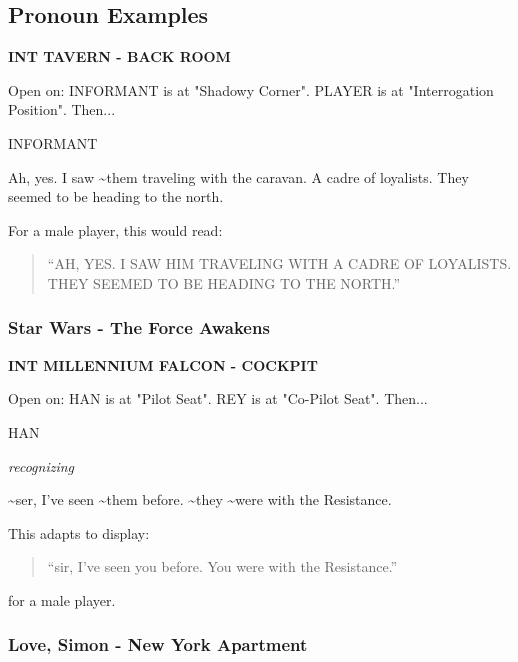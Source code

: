 \documentclass[11pt,letterpaper,oldstylefigures]{memoir}
\newcommand{\slugline}[1]{\nobreak\textbf{\MakeUppercase{#1}}\par\nobreak\vspace{1\baselineskip}}
\newcommand{\speaker}[1]{\nobreak\hspace*{0.333\textwidth}\MakeUppercase{#1}\par\nobreak\vspace{0.5\baselineskip}}
\newcommand{\dialogue}[1]{\nobreak\hspace*{0.25\textwidth}\begin{minipage}{0.5\textwidth}#1\end{minipage}\par\vspace{1\baselineskip}}
\newcommand{\parenthetical}[1]{\nobreak\vspace{0.5\baselineskip}\hspace*{0.292\textwidth}\begin{minipage}{0.416\textwidth}\textit{#1}\end{minipage}\par\vspace{0.5\baselineskip}}
\newcommand{\stagedir}[1]{#1\par\vspace{1\baselineskip}}
\newenvironment{FountainExample}
  {\begingroup
  \ttfamily\small
   \setlength{\parindent}{0pt}
  \setlength{\parskip}{0.5em}
  \allowdisplaybreaks
  \setlength{\displaywidowpenalty}{0}
  \setlength{\widowpenalty}{0}
  \setlength{\clubpenalty}{0}
  \setlength{\interlinepenalty}{0}
}
  {\endgroup}
\begin{document}
\subsection{Pronoun Examples}

\begin{FountainExample}
\slugline{INT TAVERN - BACK ROOM}

\stagedir{Open on: INFORMANT is at "Shadowy Corner". PLAYER is at "Interrogation Position". Then...}

\speaker{INFORMANT}
\dialogue{Ah, yes. I saw \textasciitilde{}them traveling with the caravan. A cadre of loyalists. They seemed to be heading to the north.}
\end{FountainExample}

For a male player, this would read:
\begin{quote}
``AH, YES. I SAW HIM TRAVELING WITH A CADRE OF LOYALISTS. THEY SEEMED TO BE HEADING TO THE NORTH.''
\end{quote}

\subsubsection*{Star Wars - The Force Awakens}
\label{ex:star-wars-the-force-awakens}

\begin{FountainExample}
\slugline{INT MILLENNIUM FALCON - COCKPIT}

\stagedir{Open on: HAN is at "Pilot Seat". REY is at "Co-Pilot Seat". Then...}

\speaker{HAN}
\parenthetical{recognizing}
\dialogue{\textasciitilde{}ser, I've seen \textasciitilde{}them before. \textasciitilde{}they \textasciitilde{}were with the Resistance.}
\end{FountainExample}

This adapts to display:
\begin{quote}
``sir, I've seen you before. You were with the Resistance.''
\end{quote}
for a male player.

\subsubsection*{Love, Simon - New York Apartment}
\label{ex:love-simon-new-york-apartment}
\end{document}
